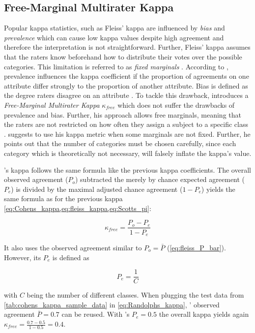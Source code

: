 \subsection{Free-Marginal Multirater Kappa}
\label{chp:fundamentals:sec:inter_rater_agreement:subsec:free_marginal_multirater_kappa}

Popular kappa statistics, such as Fleiss' kappa \parencite{Fleiss:1971} are influenced by \textit{bias} and \textit{prevalence} which can cause low kappa values despite high agreement \parencite{Randolph:2005, Sim:2005} and therefore the interpretation is not straightforward.
Further, Fleiss' kappa assumes that the raters know beforehand how to distribute their votes over the possible categories.
This limitation is referred to as \textit{fixed marginals} \parencite{Brennan:1981}.
According to \textcite{Sim:2005}, prevalence influences the kappa coefficient if the proportion of agreements on one attribute differ strongly to the proportion of another attribute.
Bias is defined as the degree raters disagree on an attribute \parencite{Sim:2005}.
To tackle this drawback, \textcite{Randolph:2005} introduces a \textit{Free-Marginal Multirater Kappa} $\kappa_{free}$ which does not suffer the drawbacks of prevalence and bias.
Further, his approach allows free marginals, meaning that the raters are not restricted on how often they assign a subject to a specific class \parencite{Brennan:1981}.
\citeauthor{Randolph:2005} suggests to use his kappa metric when some marginals are not fixed.
Further, he points out that the number of categories must be chosen carefully, since each category which is theoretically not necessary, will falsely inflate the kappa's value.

's kappa \parencite{Randolph:2005} follows the same formula like the previous kappa coefficients.
The overall observed agreement ($P_o$) subtracted the merely by chance expected agreement ($P_e$) is divided by the maximal adjusted chance agreement ($1-P_e$) yields the same formula as for the previous kappa \cref{eq:Cohens_kappa,eq:fleiss_kappa,eq:Scotts_pi}:

\begin{equation}\label{eq:Randolphs_kappa}
    \kappa_{free} = \frac{P_o - P_e}{1 - P_e}
\end{equation}

It also uses the observed agreement similar to \citeauthor{Fleiss:1971}  $P_o=\bar{P}$ (\cref{eq:fleiss_P_bar}).
However, its $P_e$ is defined as

\begin{equation}\label{eq:Randolphs_Pe}
P_e = \frac{1}{C}
\end{equation}

with $C$ being the number of different classes.
When plugging the test data from \cref{tab:cohens_kappa_sample_data} in \cref{eq:Randolphs_kappa}, \citeauthor{Fleiss:1971}' observed agreement $\bar{P} = 0.7$ can be reused.
With \citeauthor{Randolph:2005}'s $P_e = 0.5$ the overall kappa yields again $\kappa_{free} = \frac{0.7 - 0.5}{1 - 0.5} = 0.4$.
